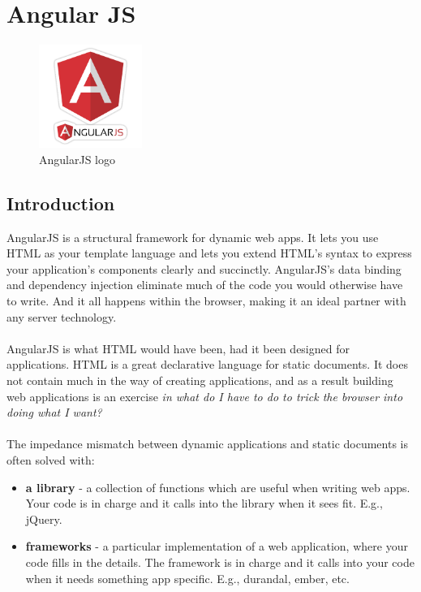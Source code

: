 \documentclass[12pt]{article}
\begin{document}
	\section{Angular JS}
		\begin{figure}[h]
		\centering
		\includegraphics[width=0.3\textwidth]{AngularJS_logo.png}
		\caption{AngularJS logo}
	\end{figure}
		\subsection{Introduction}
	AngularJS is a structural framework for dynamic web apps. It lets you use HTML as your template language and lets you extend HTML's syntax to express your application's components clearly and succinctly. AngularJS's data binding and dependency injection eliminate much of the code you would otherwise have to write.  And it all happens within the browser, making it an ideal partner with any server technology.
	\\
	\\
	AngularJS is what HTML would have been, had it been designed for applications. HTML is a great declarative language for static documents. It does not contain much in the way of creating applications, and as a result building web applications is an exercise \textit{in what do I have to do to trick the browser into doing what I want?}
	\\
	\\
	The impedance mismatch between dynamic applications and static documents is often solved with:
	\begin{itemize}
		
		\item \textbf{a library} - a collection of functions which are useful when writing web apps. Your code is in charge and it calls into the library when it sees fit. E.g., \colorbox{mygray}{jQuery}.
		\item \textbf{frameworks} - a particular implementation of a web application, where your code fills in the details. The framework is in charge and it calls into your code when it needs something app specific. E.g., \colorbox{mygray}{durandal}, \colorbox{mygray}{ember}, etc.
	\end{itemize}
\end{document}
